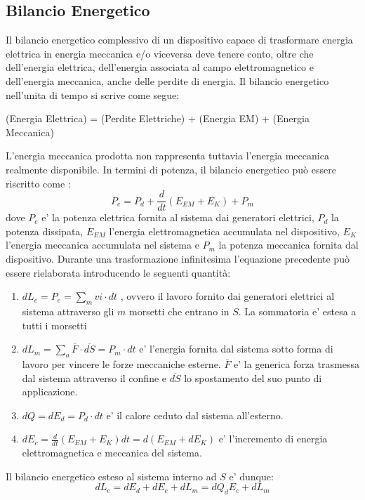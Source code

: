 \documentclass[a4paper, 10pt]{article}
\begin{document}
		\subsection{Bilancio Energetico}
			Il bilancio energetico complessivo di un dispositivo capace di trasformare energia elettrica in energia meccanica e/o
			viceversa deve tenere conto, oltre che dell'energia elettrica, dell'energia associata al campo elettromagnetico e
			dell'energia meccanica, anche delle perdite di energia. Il bilancio energetico nell'unita di tempo si scrive come 
			segue: \begin{center} (Energia Elettrica) = (Perdite Elettriche) + (Energia EM) + (Energia Meccanica) \end{center}
			L'energia meccanica prodotta non rappresenta tuttavia l'energia meccanica realmente disponibile.
			In termini di potenza, il bilancio energetico può essere riscritto come :
			\[ P_e = P_d + \frac{d}{dt} (E_{EM} + E_K) + P_m \] dove $P_e$ e' la potenza elettrica fornita al sistema dai 
			generatori elettrici, $P_d$ la potenza dissipata, $E_{EM}$ l'energia elettromagnetica accumulata nel dispositivo,
			$E_K$ l'energia meccanica accumulata nel sistema e $P_m$ la potenza meccanica fornita dal dispositivo.
			Durante una trasformazione infinitesima l'equazione precedente può essere rielaborata introducendo
			le seguenti quantità:
			\begin{enumerate}
				\item $dL_e = P_e = \sum_m vi \cdot dt$ , ovvero il lavoro fornito dai generatori elettrici al sistema attraverso
					  gli $m$ morsetti che entrano in $S$. La sommatoria e' estesa a tutti i morsetti
				\item $dL_m = \sum_a \overline{F} \cdot \overline{dS} = P_m \cdot dt$ e' l'energia fornita dal sistema 
					  sotto forma di lavoro per vincere le forze meccaniche esterne. $\overline{F}$ e' la generica forza trasmessa
					  dal sistema attraverso il confine e $\overline{dS}$ lo spostamento del suo punto di applicazione.
				\item $dQ = dE_d = P_d \cdot dt$ e' il calore ceduto dal sistema all'esterno.
				\item $dE_c = \frac{d}{dt} (E_{EM} + E_K ) dt = d(E_{EM} + dE_K)$ e' l'incremento di energia elettromagnetica 
					  e meccanica del sistema. 
			\end{enumerate}
			Il bilancio energetico esteso al sistema interno ad $S$ e' dunque:
			\[ dL_e = dE_d + dE_c + dL_m = dQ _ dE_c + dL_m \]
\end{document}
